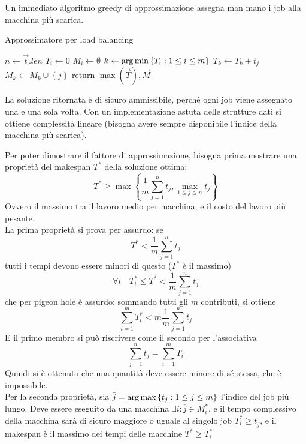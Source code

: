Un immediato algoritmo greedy di approssimazione assegna man mano i job alla macchina più scarica.
\begin{algorithm}[H]
\caption{Approssimatore per load balancing}\label{alg:lb_approx}
\begin{algorithmic}[1]
        \State $n \gets \vec{t}.len$
            \State $T_i \gets 0$
            \State $M_i \gets \emptyset$
        \EndFor
            \State $k \gets \operatorname*{arg\,min} \left\{ T_i : 1 \leq i \leq m \right\}$
            \State $T_k \gets T_k + t_j$
            \State $M_k \gets M_k \cup \left\{ j \right\}$
        \EndFor
        \State return $\max ( \vec{T} ), \vec{M}$
    \EndProcedure
\end{algorithmic}
\end{algorithm}
La soluzione ritornata è di sicuro ammissibile, perché ogni job viene assegnato una e una sola volta. Con un implementazione astuta delle strutture dati si ottiene complessità lineare (bisogna avere sempre disponibile l'indice della macchina più scarica).

Per poter dimostrare il fattore di approssimazione, bisogna prima mostrare una proprietà del makespan $T^*$ della soluzione ottima:
\begin{equation*}
    T^* \geq
    \max
    \left\{ 
        \frac{1}{m}
        \sum_{j=1}^{n} t_j
        ,
        \max_{1 \leq j \leq n} t_j
    \right\}
\end{equation*}
Ovvero il massimo tra il lavoro medio per macchina, e il costo del lavoro più pesante.
\\
La prima proprietà si prova per assurdo: se 
\begin{equation*}
    T^* <
    \frac{1}{m}
    \sum_{j=1}^{n} t_j
\end{equation*}
tutti i tempi devono essere minori di questo ($T^*$ è il massimo)
\begin{equation*}
    \forall i \quad
    T_{i}^{*} \leq
    T^* <
    \frac{1}{m}
    \sum_{j=1}^{n} t_j
\end{equation*}
che per pigeon hole è assurdo: sommando tutti gli $m$ contributi, si ottiene
\begin{equation*}
    \sum_{i=1}^{m}
    T_{i}^{*}
    <
    m
    \frac{1}{m}
    \sum_{j=1}^{n} t_j
\end{equation*}
E il primo membro si può riscrivere come il secondo per l'associativa
\begin{equation*}
    \sum_{j=1}^{n} t_j
    =
    \sum_{i=1}^{m} T_i
\end{equation*}
Quindi si è ottenuto che una quantità deve essere minore di sé stessa, che è impossibile.
\\
Per la seconda proprietà, sia
$
\bar{j} = \operatorname*{arg\,max} \left\{ t_j : 1 \leq j \leq m \right\}
$
l'indice del job più lungo. Deve essere eseguito da una macchina
$
\exists i : \bar{j} \in M_{i}^{*}
$, e il tempo complessivo della macchina sarà di sicuro maggiore o uguale al singolo job
$
T_{i}^{*}
\geq
t_{\bar{j}}
$, e il makespan è il massimo dei tempi delle macchine
$
T^* \geq
T_{i}^{*}
$

